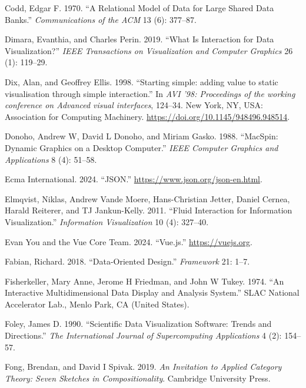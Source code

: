 \documentclass[
]{book}
\newlength{\cslhangindent}
\newenvironment{CSLReferences}[2] %
 {\begin{list}{}{%
  \setlength{\itemindent}{0pt}
  \setlength{\leftmargin}{0pt}
  \setlength{\parsep}{0pt}
  \ifodd #1
   \setlength{\leftmargin}{\cslhangindent}
   \setlength{\itemindent}{-1\cslhangindent}
  \fi
  \setlength{\itemsep}{#2\baselineskip}}}
 {\end{list}}
\theoremstyle{definition}
\theoremstyle{definition}
\theoremstyle{definition}
\theoremstyle{definition}
\theoremstyle{remark}
\begin{document}
\begin{CSLReferences}{1}{0}
Codd, Edgar F. 1970. {``A Relational Model of Data for Large Shared Data Banks.''} \emph{Communications of the ACM} 13 (6): 377--87.

Dimara, Evanthia, and Charles Perin. 2019. {``What Is Interaction for Data Visualization?''} \emph{IEEE Transactions on Visualization and Computer Graphics} 26 (1): 119--29.

Dix, Alan, and Geoffrey Ellis. 1998. {``{Starting simple: adding value to static visualisation through simple interaction}.''} In \emph{{AVI '98: Proceedings of the working conference on Advanced visual interfaces}}, 124--34. New York, NY, USA: Association for Computing Machinery. \url{https://doi.org/10.1145/948496.948514}.

Donoho, Andrew W, David L Donoho, and Miriam Gasko. 1988. {``MacSpin: Dynamic Graphics on a Desktop Computer.''} \emph{IEEE Computer Graphics and Applications} 8 (4): 51--58.

Ecma International. 2024. {``JSON.''} \url{https://www.json.org/json-en.html}.

Elmqvist, Niklas, Andrew Vande Moere, Hans-Christian Jetter, Daniel Cernea, Harald Reiterer, and TJ Jankun-Kelly. 2011. {``Fluid Interaction for Information Visualization.''} \emph{Information Visualization} 10 (4): 327--40.

Evan You and the Vue Core Team. 2024. {``Vue.js.''} \url{https://vuejs.org}.

Fabian, Richard. 2018. {``Data-Oriented Design.''} \emph{Framework} 21: 1--7.

Fisherkeller, Mary Anne, Jerome H Friedman, and John W Tukey. 1974. {``An Interactive Multidimensional Data Display and Analysis System.''} SLAC National Accelerator Lab., Menlo Park, CA (United States).

Foley, James D. 1990. {``Scientific Data Visualization Software: Trends and Directions.''} \emph{The International Journal of Supercomputing Applications} 4 (2): 154--57.

Fong, Brendan, and David I Spivak. 2019. \emph{An Invitation to Applied Category Theory: Seven Sketches in Compositionality}. Cambridge University Press.


\end{CSLReferences}
\end{document}
